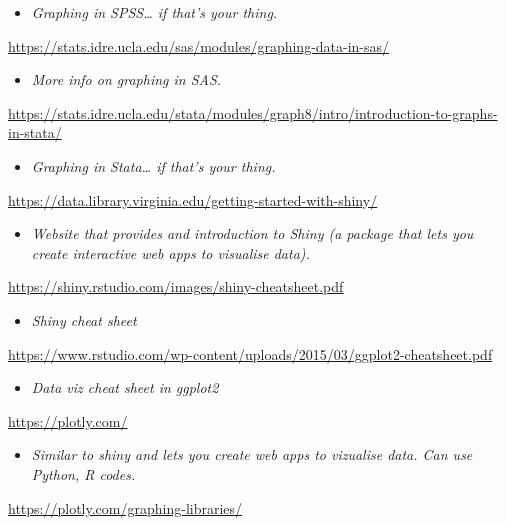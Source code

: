 \documentclass[
]{book}
\providecommand{\tightlist}{%
  \setlength{\itemsep}{0pt}\setlength{\parskip}{0pt}}
\begin{document}
\begin{itemize}
\tightlist
\item
  \emph{Graphing in SPSS\ldots{} if that's your thing.}
\end{itemize}

\url{https://stats.idre.ucla.edu/sas/modules/graphing-data-in-sas/}

\begin{itemize}
\tightlist
\item
  \emph{More info on graphing in SAS.}
\end{itemize}

\url{https://stats.idre.ucla.edu/stata/modules/graph8/intro/introduction-to-graphs-in-stata/}

\begin{itemize}
\tightlist
\item
  \emph{Graphing in Stata\ldots{} if that's your thing.}
\end{itemize}

\url{https://data.library.virginia.edu/getting-started-with-shiny/}

\begin{itemize}
\tightlist
\item
  \emph{Website that provides and introduction to Shiny (a package that lets you create interactive web apps to visualise data).}
\end{itemize}

\url{https://shiny.rstudio.com/images/shiny-cheatsheet.pdf}

\begin{itemize}
\tightlist
\item
  \emph{Shiny cheat sheet}
\end{itemize}

\url{https://www.rstudio.com/wp-content/uploads/2015/03/ggplot2-cheatsheet.pdf}

\begin{itemize}
\tightlist
\item
  \emph{Data viz cheat sheet in ggplot2}
\end{itemize}

\url{https://plotly.com/}

\begin{itemize}
\tightlist
\item
  \emph{Similar to shiny and lets you create web apps to vizualise data. Can use Python, R codes.}
\end{itemize}

\url{https://plotly.com/graphing-libraries/}
\end{document}
